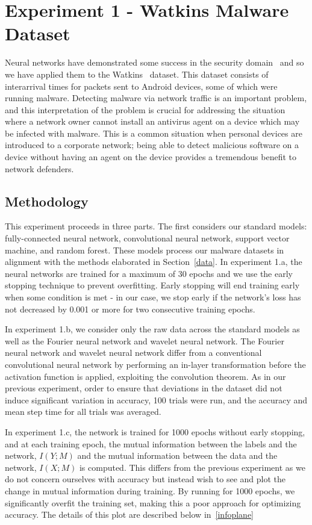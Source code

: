 \chapter{Experiment 1 - Watkins Malware Dataset}
\label{chap:three}
Neural networks have demonstrated some success in the security domain~\cite{raff2018malware} and so we have applied them to the Watkins~\cite{watkins2013using} dataset.
This dataset consists of interarrival times for packets sent to Android devices, some of which were running malware.
Detecting malware via network traffic is an important problem, and this interpretation of the problem is crucial for addressing the situation where a network owner cannot install an antivirus agent on a device which may be infected with malware.
This is a common situation when personal devices are introduced to a corporate network; being able to detect malicious software on a device without having an agent on the device provides a tremendous benefit to network defenders.

\section{Methodology}
This experiment proceeds in three parts.
The first considers our standard models: fully-connected neural network, convolutional neural network, support vector machine, and random forest.
These models process our malware datasets in alignment with the methods elaborated in Section~\ref{data}.
In experiment 1.a, the neural networks are trained for a maximum of 30 epochs and we use the early stopping technique to prevent overfitting.
Early stopping will end training early when some condition is met - in our case, we stop early if the network's loss has not decreased by 0.001 or more for two consecutive training epochs.

In experiment 1.b, we consider only the raw data across the standard models as well as the Fourier neural network and wavelet neural network.
The Fourier neural network and wavelet neural network differ from a conventional convolutional neural network by performing an in-layer transformation before the activation function is applied, exploiting the convolution theorem.
As in our previous experiment, order to ensure that deviations in the dataset did not induce significant variation in accuracy, 100 trials were run, and the accuracy and mean step time for all trials was averaged.

In experiment 1.c, the network is trained for 1000 epochs without early stopping, and at each training epoch, the mutual information between the labels and the network, $I(Y; M)$ and the mutual information between the data and the network, $I(X; M)$ is computed.
This differs from the previous experiment as we do not concern ourselves with accuracy but instead wish to see and plot the change in mutual information during training.
By running for 1000 epochs, we significantly overfit the training set, making this a poor approach for optimizing accuracy.
The details of this plot are described below in~\ref{infoplane}


